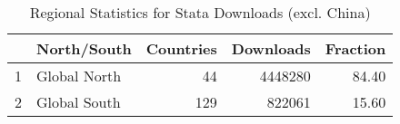 \begin{table}[ht]
\centering
\begin{tabular}{rlrrr}
  \hline
 & North/South & Countries & Downloads & Fraction \\ 
  \hline
1 & Global North &  44 & 4448280 & 84.40 \\ 
  2 & Global South & 129 & 822061 & 15.60 \\ 
   \hline
\end{tabular}
\caption{Regional Statistics for Stata Downloads (excl. China)} 
\label{tab:stata_downloads_global_stats_select_nochina}
\end{table}
